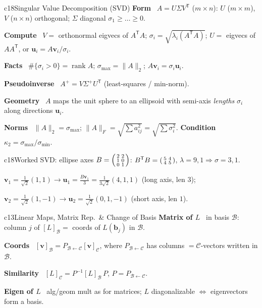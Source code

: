 \documentclass[10pt]{extarticle}
\newcommand{\h}[1]{{\bfseries #1}\ }
\newcommand{\key}[1]{\colorbox{hl}{$#1$}}
\newcommand{\T}{^{\mathsf T}}
\newcommand{\rank}{\operatorname{rank}}
\newcommand{\bv}{\mathbf{v}}
\newcommand{\bu}{\mathbf{u}}
\begin{document}
\begin{multicols}{2}
\begin{tbox}{c18}{Singular Value Decomposition (SVD)}
\h{Form} \key{A=U\Sigma V\T} ($m{\times}n$): $U$ ($m{\times}m$), $V$ ($n{\times}n$) orthogonal; $\Sigma$ diagonal $\sigma_1\ge\dots\ge0$.\par
\h{Compute} $V=$ orthonormal eigvecs of $A\T A$; \key{\sigma_i=\sqrt{\lambda_i(A\T A)}}; $U=$ eigvecs of $AA\T$, or $\bu_i=A\bv_i/\sigma_i$.\par
\h{Facts} $\#\{\sigma_i>0\}=\rank A$; $\sigma_{\max}=\|A\|_2$; $A\bv_i=\sigma_i\bu_i$.\par
\h{Pseudoinverse} $A^{+}=V\Sigma^{+}U\T$ (least-squares / min-norm).\par
\h{Geometry} $A$ maps the unit sphere to an ellipsoid with semi-axis \emph{lengths} $\sigma_i$ along directions $\bu_i$.\par
\h{Norms} $\|A\|_2=\sigma_{\max}$; $\|A\|_F=\sqrt{\sum a_{ij}^2}=\sqrt{\sum\sigma_i^2}$. \h{Condition} $\kappa_2=\sigma_{\max}/\sigma_{\min}$.
\end{tbox}

\begin{tbox}{c18}{Worked SVD: ellipse axes}
\footnotesize $B=\begin{psmallmatrix}2&2\\1&0\\0&1\end{psmallmatrix}$: $B\T B=\begin{psmallmatrix}5&4\\4&5\end{psmallmatrix}$, $\lambda=9,1\Rightarrow\sigma=3,1$.\par
$\bv_1=\tfrac1{\sqrt2}(1,1)\!\to\!\bu_1=\tfrac{B\bv_1}{3}=\tfrac1{3\sqrt2}(4,1,1)$ (long axis, len $3$);\par
$\bv_2=\tfrac1{\sqrt2}(1,-1)\!\to\!\bu_2=\tfrac1{\sqrt2}(0,1,-1)$ (short axis, len $1$).
\end{tbox}

\begin{tbox}{c13}{Linear Maps, Matrix Rep.\ \& Change of Basis}
\h{Matrix of $L$} in basis $\mathcal B$: column $j$ of $[L]_{\mathcal B}=$ coords of $L(\mathbf b_j)$ in $\mathcal B$.\par
\h{Coords} $[\bv]_{\mathcal B}=P_{\mathcal B\leftarrow\mathcal C}[\bv]_{\mathcal C}$, where $P_{\mathcal B\leftarrow\mathcal C}$ has columns $=\mathcal C$-vectors written in $\mathcal B$.\par
\h{Similarity} \key{[L]_{\mathcal C}=P^{-1}[L]_{\mathcal B}\,P}, $P=P_{\mathcal B\leftarrow\mathcal C}$.\par
\h{Eigen of $L$} alg/geom mult as for matrices; $L$ diagonalizable $\iff$ eigenvectors form a basis.
\end{tbox}


\end{multicols}
\end{document}
